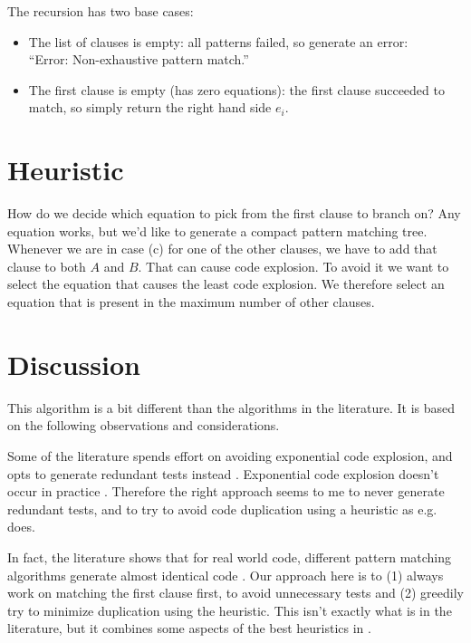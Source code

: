 \documentclass[a4paper, 11pt]{article}
\theoremstyle{definition}
\begin{document}
\medskip

\noindent The recursion has two base cases:
\begin{itemize}
  \item The list of clauses is empty: all patterns failed, so generate an error:\\ ``Error: Non-exhaustive pattern match.''
  \item The first clause is empty (has zero equations): the first clause succeeded to match, so simply return the right hand side $e_i$.
\end{itemize}

\section{Heuristic}

How do we decide which equation to pick from the first clause to branch on? Any equation works, but we'd like to generate a compact pattern matching tree. Whenever we are in case (c) for one of the other clauses, we have to add that clause to both $A$ and $B$. That can cause code explosion. To avoid it we want to select the equation that causes the least code explosion. We therefore select an equation that is present in the maximum number of other clauses.

\section{Discussion}

This algorithm is a bit different than the algorithms in the literature. It is based on the following observations and considerations.

Some of the literature spends effort on avoiding exponential code explosion, and opts to generate redundant tests instead \cite{augustsson_compiling_1985}. Exponential code explosion doesn't occur in practice \cite{scott_when_2000}. Therefore the right approach seems to me to never generate redundant tests, and to try to avoid code duplication using a heuristic as e.g. \cite{maranget_compiling_2008} does.

In fact, the literature shows that for real world code, different pattern matching algorithms generate almost identical code \cite{scott_when_2000,maranget_compiling_2008}. Our approach here is to (1) always work on matching the first clause first, to avoid unnecessary tests and (2) greedily try to minimize duplication using the heuristic. This isn't exactly what is in the literature, but it combines some aspects of the best heuristics in \cite{maranget_compiling_2008}.
\end{document}
